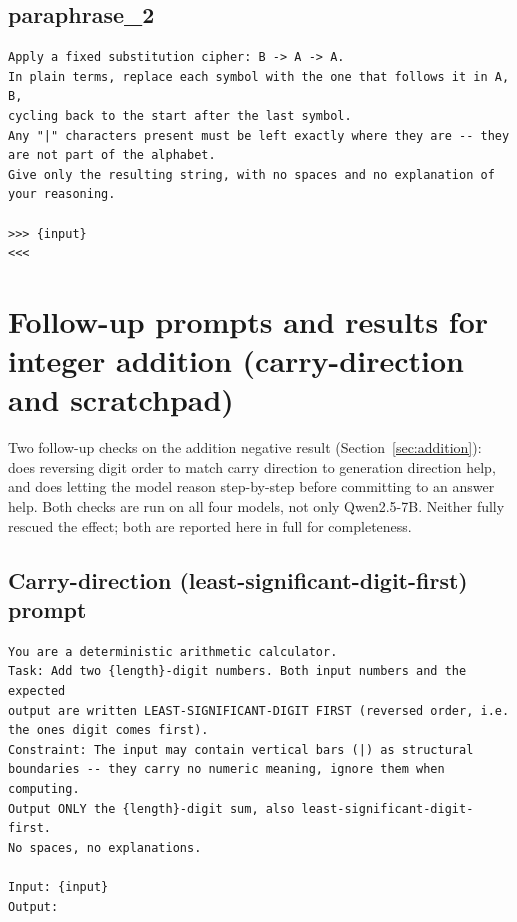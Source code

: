 \documentclass[11pt]{article}
\begin{document}
\subsection*{paraphrase\_2}
\begin{verbatim}
Apply a fixed substitution cipher: B -> A -> A.
In plain terms, replace each symbol with the one that follows it in A, B,
cycling back to the start after the last symbol.
Any "|" characters present must be left exactly where they are -- they
are not part of the alphabet.
Give only the resulting string, with no spaces and no explanation of
your reasoning.

>>> {input}
<<<
\end{verbatim}

\section{Follow-up prompts and results for integer addition (carry-direction and scratchpad)}
\label{app:addition-followups}

Two follow-up checks on the addition negative result (Section~\ref{sec:addition}): does reversing digit order to match carry direction to generation direction help, and does letting the model reason step-by-step before committing to an answer help. Both checks are run on all four models, not only Qwen2.5-7B. Neither fully rescued the effect; both are reported here in full for completeness.

\subsection*{Carry-direction (least-significant-digit-first) prompt}
\begin{verbatim}
You are a deterministic arithmetic calculator.
Task: Add two {length}-digit numbers. Both input numbers and the expected
output are written LEAST-SIGNIFICANT-DIGIT FIRST (reversed order, i.e.
the ones digit comes first).
Constraint: The input may contain vertical bars (|) as structural
boundaries -- they carry no numeric meaning, ignore them when computing.
Output ONLY the {length}-digit sum, also least-significant-digit-first.
No spaces, no explanations.

Input: {input}
Output:
\end{verbatim}
\end{document}
